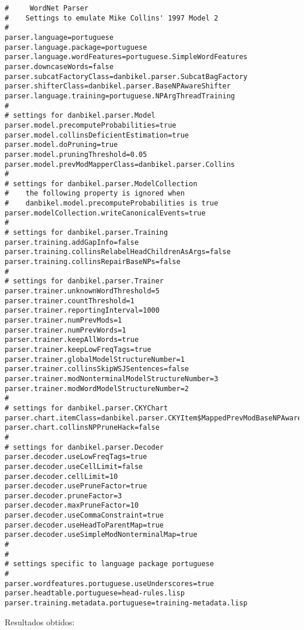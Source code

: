 \scriptsize
\begin{verbatim}
#     WordNet Parser
#    Settings to emulate Mike Collins' 1997 Model 2
#
parser.language=portuguese
parser.language.package=portuguese
parser.language.wordFeatures=portuguese.SimpleWordFeatures
parser.downcaseWords=false
parser.subcatFactoryClass=danbikel.parser.SubcatBagFactory
parser.shifterClass=danbikel.parser.BaseNPAwareShifter
parser.language.training=portuguese.NPArgThreadTraining
#
# settings for danbikel.parser.Model
parser.model.precomputeProbabilities=true
parser.model.collinsDeficientEstimation=true
parser.model.doPruning=true
parser.model.pruningThreshold=0.05
parser.model.prevModMapperClass=danbikel.parser.Collins
#
# settings for danbikel.parser.ModelCollection
#    the following property is ignored when
#    danbikel.model.precomputeProbabilities is true
parser.modelCollection.writeCanonicalEvents=true
#
# settings for danbikel.parser.Training
parser.training.addGapInfo=false
parser.training.collinsRelabelHeadChildrenAsArgs=false
parser.training.collinsRepairBaseNPs=false
#
# settings for danbikel.parser.Trainer
parser.trainer.unknownWordThreshold=5
parser.trainer.countThreshold=1
parser.trainer.reportingInterval=1000
parser.trainer.numPrevMods=1
parser.trainer.numPrevWords=1
parser.trainer.keepAllWords=true
parser.trainer.keepLowFreqTags=true
parser.trainer.globalModelStructureNumber=1
parser.trainer.collinsSkipWSJSentences=false
parser.trainer.modNonterminalModelStructureNumber=3
parser.trainer.modWordModelStructureNumber=2
#
# settings for danbikel.parser.CKYChart
parser.chart.itemClass=danbikel.parser.CKYItem$MappedPrevModBaseNPAware
parser.chart.collinsNPPruneHack=false
#
# settings for danbikel.parser.Decoder
parser.decoder.useLowFreqTags=true
parser.decoder.useCellLimit=false
parser.decoder.cellLimit=10
parser.decoder.usePruneFactor=true
parser.decoder.pruneFactor=3
parser.decoder.maxPruneFactor=10
parser.decoder.useCommaConstraint=true
parser.decoder.useHeadToParentMap=true
parser.decoder.useSimpleModNonterminalMap=true
#
#
# settings specific to language package portuguese
#
parser.wordfeatures.portuguese.useUnderscores=true
parser.headtable.portuguese=head-rules.lisp
parser.training.metadata.portuguese=training-metadata.lisp

\end{verbatim}

\normalsize

Resultados obtidos:

